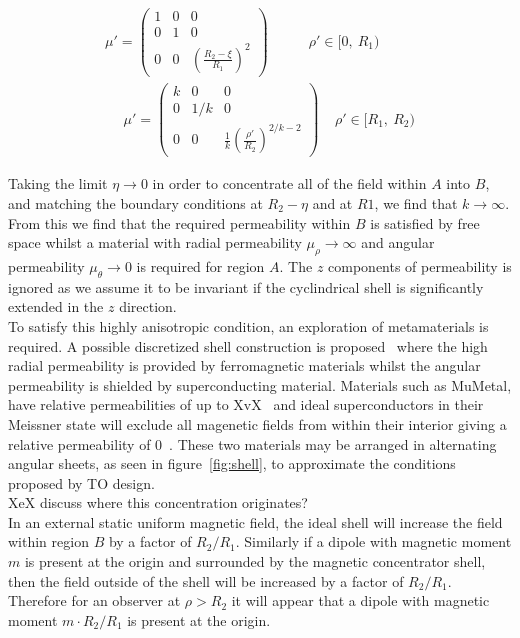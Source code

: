 \documentclass[11pt]{iopart}
\begin{document}
\begin{equation}
  \label{eqn:mat}
  \begin{split}
 \mu' = \begin{pmatrix}1&0&0\\0&1&0\\0&0&(\frac{R_2-\xi}{R_1})^2\end{pmatrix}~~~~~~~~~~~~~\rho'\in[0,~R_1)~~\\
~~~~~~\mu' = \begin{pmatrix}k&0&0\\0&1/k&0\\0&0&\frac{1}{k}(\frac{\rho'}{R_2})^{2/k-2}\end{pmatrix}~~~~~\rho'\in[R_1,~R_2)
  \end{split}
\end{equation}

Taking the limit $\eta \rightarrow 0$ in order to concentrate all of
the field within $A$ into $B$, and matching the boundary conditions at
$R_2-\eta$ and at $R1$, we find that $k \rightarrow \infty$. From this
we find that the required permeability within $B$ is satisfied by free
space whilst a material with radial permeability $\mu_\rho \rightarrow
\infty$ and angular permeability $\mu_\theta \rightarrow 0$ is
required for region $A$. The $z$ components of permeability is ignored
as we assume it to be invariant if the cyclindrical shell is
significantly extended in the $z$ direction.\\

To satisfy this highly anisotropic condition, an exploration of
metamaterials is required. A possible discretized shell construction
is proposed~\cite{PRATT} where the high radial permeability is
provided by ferromagnetic materials whilst the angular permeability is
shielded by superconducting material. Materials such as
MuMetal, have relative permeabilities of up to XvX~\cite{MUMETAL} and
ideal superconductors in their Meissner state will exclude all
magenetic fields from within their interior giving a relative
permeability of $0$~\cite{Meissner}.  These two materials may be arranged in
alternating angular sheets, as seen in figure~\ref{fig:shell}, to
approximate the conditions proposed by TO design. \\

XeX discuss where this concentration originates? \\
In an external static uniform magnetic field, the ideal shell will
increase the field within region $B$ by a factor of
$R_2/R_1$. Similarly if a dipole with magnetic moment $m$ is present
at the origin and surrounded by the magnetic concentrator shell, then
the field outside of the shell will be increased by a factor of
$R_2/R_1$. Therefore for an observer at $\rho > R_2$ it will appear
that a dipole with magnetic moment $m\cdot R_2/R_1$ is present at the
origin.\\
\end{document}

